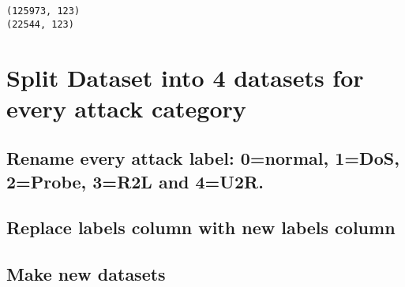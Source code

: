 \documentclass[11pt]{article}
\begin{document}
    \begin{Verbatim}[commandchars=\\\{\}]
(125973, 123)
(22544, 123)
    \end{Verbatim}

    \hypertarget{split-dataset-into-4-datasets-for-every-attack-category}{%
\section{Split Dataset into 4 datasets for every attack
category}\label{split-dataset-into-4-datasets-for-every-attack-category}}

\hypertarget{rename-every-attack-label-0normal-1dos-2probe-3r2l-and-4u2r.}{%
\subsection{Rename every attack label: 0=normal, 1=DoS, 2=Probe, 3=R2L
and
4=U2R.}\label{rename-every-attack-label-0normal-1dos-2probe-3r2l-and-4u2r.}}

\hypertarget{replace-labels-column-with-new-labels-column}{%
\subsection{Replace labels column with new labels
column}\label{replace-labels-column-with-new-labels-column}}

\hypertarget{make-new-datasets}{%
\subsection{Make new datasets}\label{make-new-datasets}}
\end{document}
